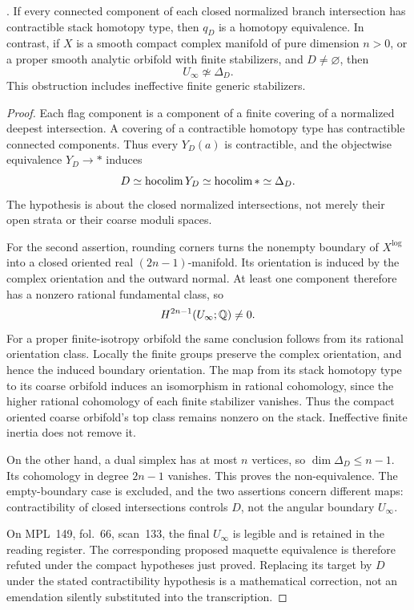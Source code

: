 \begin{proposition}
\label{P4b}
. If every connected component of each closed normalized branch intersection has contractible stack homotopy type, then $q_D$ is a homotopy equivalence. In contrast, if $X$ is a smooth compact complex manifold of pure dimension $n>0$, or a proper smooth analytic orbifold with finite stabilizers, and $D\ne\varnothing$, then
\[
 U_\infty\not\simeq\Delta_D.
\]
This obstruction includes ineffective finite generic stabilizers.
\end{proposition}
\begin{proof}
Each flag component is a component of a finite covering of a normalized deepest intersection. A covering of a contractible homotopy type has contractible connected components. Thus every $Y_D(a)$ is contractible, and the objectwise equivalence $Y_D\to *$ induces
\[
 D\simeq\operatorname*{hocolim} Y_D\simeq\operatorname*{hocolim} *\simeq\Delta_D.
\]
The hypothesis is about the closed normalized intersections, not merely their open strata or their coarse moduli spaces.

For the second assertion, rounding corners turns the nonempty boundary of $X^{\log}$ into a closed oriented real $(2n-1)$-manifold. Its orientation is induced by the complex orientation and the outward normal. At least one component therefore has a nonzero rational fundamental class, so
\[
 H^{2n-1}(U_\infty;\mathbb Q)\ne0.
\]
For a proper finite-isotropy orbifold the same conclusion follows from its rational orientation class. Locally the finite groups preserve the complex orientation, and hence the induced boundary orientation. The map from its stack homotopy type to its coarse orbifold induces an isomorphism in rational cohomology, since the higher rational cohomology of each finite stabilizer vanishes. Thus the compact oriented coarse orbifold's top class remains nonzero on the stack. Ineffective finite inertia does not remove it.

On the other hand, a dual simplex has at most $n$ vertices, so $\dim\Delta_D\le n-1$. Its cohomology in degree $2n-1$ vanishes. This proves the non-equivalence. The empty-boundary case is excluded, and the two assertions concern different maps: contractibility of closed intersections controls $D$, not the angular boundary $U_\infty$.

On MPL~149, fol.~66, scan~133, the final $U_\infty$ is legible and is retained in the reading register. The corresponding proposed maquette equivalence is therefore refuted under the compact hypotheses just proved. Replacing its target by $D$ under the stated contractibility hypothesis is a mathematical correction, not an emendation silently substituted into the transcription.
\end{proof}

